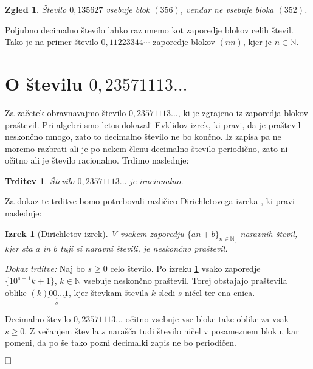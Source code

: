 \documentclass[a4paper,12pt]{article}
\def\N{\mathbb{N}} %
\def\qed{$\hfill\Box$}   %
\newtheorem{izrek}{Izrek}
\newtheorem{trditev}{Trditev}
\newtheorem{zgled}{Zgled}
\begin{document}
\begin{zgled}
    Število $0,135627$ vsebuje blok $(356)$, vendar ne vsebuje bloka $(352)$.
\end{zgled}

Poljubno decimalno število lahko razumemo kot zaporedje blokov celih števil.
Tako je na primer število $0,11223344 \cdots$ zaporedje blokov $(nn)$,
kjer je $n \in \N$.


\section{O številu $0,23571113 \dots$}

Za začetek obravnavajmo število $0,23571113 \dots$, ki je zgrajeno iz zaporedja
blokov praštevil. 
Pri algebri smo letos dokazali Evklidov izrek, ki pravi, da je praštevil neskončno mnogo,
zato to decimalno število ne bo končno. 
Iz zapisa pa ne moremo razbrati ali 
je po nekem členu decimalno število periodično, zato ni očitno ali je število racionalno.
Trdimo naslednje:

\begin{trditev}
    \label{trditev praštevila}
    Število $0,23571113 \dots$ je iracionalno.
\end{trditev}

Za dokaz te trditve bomo potrebovali različico Dirichletovega izreka \cite{Vog}, ki pravi naslednje:

\begin{izrek}[Dirichletov izrek]
    \label{Dirichletov izrek}
    V vsakem zaporedju $ \lbrace an + b \rbrace_{n \in \N_0}$ naravnih števil, kjer sta $a$ in $b$
    tuji si naravni števili, je neskončno praštevil.
\end{izrek}

\noindent
{\em Dokaz trditve:\/} Naj bo $s \geq 0$ celo število. Po izreku \ref{Dirichletov izrek} vsako zaporedje
$ \{10^{s+1}k + 1\}$, $k \in \N$ vsebuje neskončno praštevil. Torej obstajajo praštevila
oblike $(k)\underbrace{00 \dots}_{s}1$, kjer števkam števila $k$ sledi $s$ ničel ter ena enica. 

Decimalno število $0,23571113\dots$ očitno vsebuje vse bloke take oblike za vsak $s \geq 0$. Z večanjem števila
$s$ narašča tudi število ničel v posameznem bloku, kar pomeni, da po še tako pozni decimalki zapis ne bo periodičen.

\qed
\end{document}
